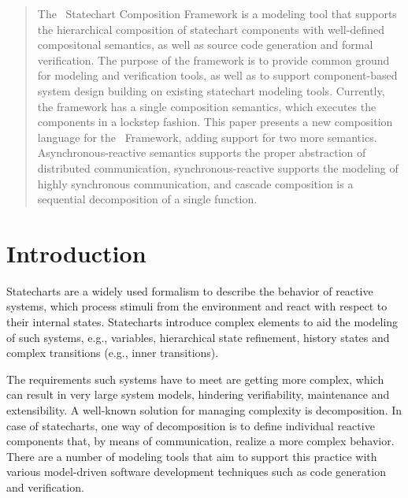 \begin{abstract}

The \gamma\ Statechart Composition Framework is a modeling tool that supports the hierarchical composition of statechart components with well-defined compositonal semantics, as well as source code generation and formal verification. The purpose of the framework is to provide common ground for modeling and verification tools, as well as to support component-based system design building on existing statechart modeling tools. Currently, the framework has a single composition semantics, which executes the components in a lockstep fashion. This paper presents a new composition language for the \gamma\ Framework, adding support for two more semantics. Asynchronous-reactive semantics supports the proper abstraction of distributed communication, synchronous-reactive supports the modeling of highly synchronous communication, and cascade composition is a sequential decomposition of a single function. 
\end{abstract}
%
\IEEEpeerreviewmaketitle

\section{Introduction}
\label{sec:introduction}
Statecharts \cite{Harel:1987:SVF:34884.34886} are a widely used formalism to describe the behavior of reactive systems, which process stimuli from the environment and react with respect to their internal states. Statecharts introduce complex elements to aid the modeling of such systems, e.g., variables, hierarchical state refinement, history states and complex transitions (e.g., inner transitions).

The requirements such systems have to meet are getting more complex, which can result in very large system models, hindering verifiability, maintenance and extensibility. A well-known solution for managing complexity is decomposition. In case of statecharts, one way of decomposition is to define individual reactive components that, by means of communication, realize a more complex behavior. There are a number of modeling tools that aim to support this practice with various model-driven software development techniques such as code generation and verification.

